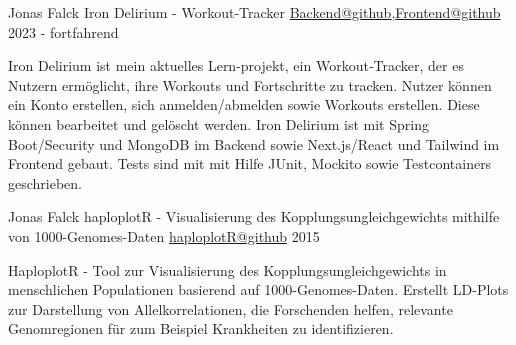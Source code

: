 \begin{cventries}
  \cventry
    {Jonas Falck} %
    {Iron Delirium - Workout‑Tracker} %
    {\href{https://github.com/joe-nas/workout-app}{Backend@github},\href{https://github.com/joe-nas/workout-app-frontend-next}{Frontend@github}} %
    {2023 - fortfahrend} %
    {
      \begin{cvitems} %
        \item {Iron Delirium ist mein aktuelles Lern-projekt, ein Workout‑Tracker, der es Nutzern ermöglicht, ihre Workouts und Fortschritte zu tracken. Nutzer
        können ein Konto erstellen, sich anmelden/abmelden sowie Workouts erstellen. Diese können bearbeitet und gelöscht werden. Iron Delirium
        ist mit Spring Boot/Security und MongoDB im Backend sowie Next.js/React und Tailwind im Frontend gebaut. Tests sind mit mit Hilfe JUnit,
        Mockito sowie Testcontainers geschrieben.}
        \vspace{0.2cm}
        \newline{}   
            
         
      \end{cvitems}
    }

  \cventry
    {Jonas Falck} %
    {haploplotR - Visualisierung des Kopplungsungleichgewichts mithilfe von 1000-Genomes-Daten} %
    {\href{https://github.com/joe-nas/haploplotR}{haploplotR@github}} %
    {2015} %
    {
      \begin{cvitems} %
        \item {HaploplotR - Tool zur Visualisierung des Kopplungsungleichgewichts in menschlichen Populationen basierend auf 1000-Genomes-Daten. 
        Erstellt LD-Plots zur Darstellung von Allelkorrelationen, die Forschenden helfen, relevante Genomregionen für zum Beispiel Krankheiten zu identifizieren.}
        \vspace{0.2cm}
        \newline{}   
      \end{cvitems}
    }
\end{cventries}
